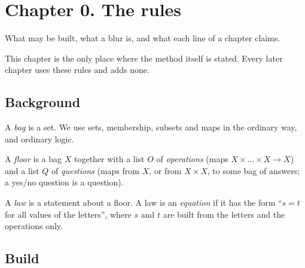


\section*{Chapter 0. The rules}
\begin{center}
{\small What may be built, what a blur is, and what each line of a chapter claims.}
\end{center}

This chapter is the only place where the method itself is stated. Every later chapter uses these rules and adds none.

\subsection*{Background}

\begin{lines}
\item[\lab{S1}] A \emph{bag} is a set. We use sets, membership, subsets and maps in the ordinary way, and ordinary logic.
\item[\lab{S2}] A \emph{floor} is a bag $X$ together with a list $O$ of \emph{operations} (maps $X \times \dots \times X \to X$) and a list $Q$ of \emph{questions} (maps from $X$, or from $X \times X$, to some bag of answers; a yes/no question is a question).
\item[\lab{S3}] A \emph{law} is a statement about a floor. A law is an \emph{equation} if it has the form ``$s = t$ for all values of the letters'', where $s$ and $t$ are built from the letters and the operations only.
\end{lines}

\subsection*{Build}

